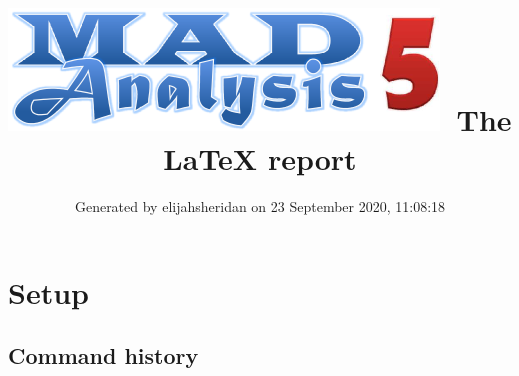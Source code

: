 \documentclass[a4paper, 10pt]{article}
\title{{\includegraphics[scale=.4]{logo.png}}\ The LaTeX report}
\author{Generated by elijahsheridan on 23 September 2020, 11:08:18}
\begin{document}
\maketitle
\flushbottom

\newpage
\section{ Setup}

\subsection{ Command history}
\end{document}
